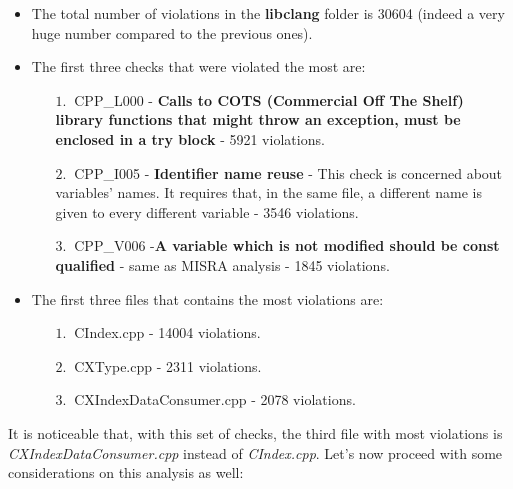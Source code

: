 \begin{itemize}
	\item The total number of violations in the \textbf{libclang} folder is 30604 (indeed a very huge number compared to the previous ones).
	\item The first three checks that were violated the most are:
	\begin{itemize}
		\item[$1.\:$] CPP\_L000 - \textbf{Calls to COTS (Commercial Off The Shelf) library functions that might throw an exception, must be enclosed in a try block} - 5921 violations.\newline
		\item[$2.\:$] CPP\_I005 - \textbf{Identifier name reuse} - This check is concerned about variables' names. It requires that, in the same file, a different name is given to every different variable - 3546 violations.\newline 
		\item[$3.\:$] CPP\_V006 -\textbf{A variable which is not modified should be const qualified} - same as MISRA analysis - 1845 violations.\newline
	\end{itemize}
	\item The first three files that contains the most violations are:
		\begin{itemize}
		\item[$1.\:$] CIndex.cpp - 14004 violations.
		\item[$2.\:$] CXType.cpp - 2311 violations.
		\item[$3.\:$] CXIndexDataConsumer.cpp - 2078 violations.
	\end{itemize}
\end{itemize}

It is noticeable that, with this set of checks, the third file with most violations is \textsl{CXIndexDataConsumer.cpp} instead of \textsl{CIndex.cpp}.\newline
Let's now proceed with some considerations on this analysis as well:


